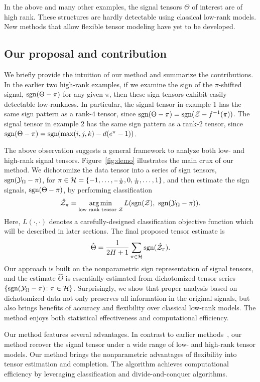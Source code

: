 \documentclass{article}
\theoremstyle{plain}
\theoremstyle{definition}
\def\sign{\textup{sgn}}
\begin{document}
In the above and many other examples, the signal tensors $\Theta$ of interest are of high rank. These structures are hardly detectable using classical low-rank models. New methods that allow flexible tensor modeling have yet to be developed. 


\subsection{Our proposal and contribution}\label{sec:overview}
We briefly provide the intuition of our method and summarize the contributions. In the earlier two high-rank examples, if we examine the sign of the $\pi$-shifted signal, $\sign(\Theta-\pi)$ for any given $\pi$, then these sign tensors exhibit easily detectable low-rankness. In particular, the signal tensor in example 1 has the same sign pattern as a rank-$4$ tensor, since $\sign(\Theta-\pi)=\sign(\tZ-f^{-1}(\pi))$. The signal tensor in example 2 has the same sign pattern as a rank-2 tensor, since $\sign(\Theta-\pi)=\sign(\max(i,j,k)-d(e^{\pi}-1))$.


The above observation suggests a general framework to analyze both low- and high-rank signal tensors. Figure~\ref{fig:demo} illustrates the main crux of our method. We dichotomize the data tensor into a series of sign tensors, $\sign (\tY_\Omega-\pi)$, for $\pi\in \mathcal{H}=\{-1,\ldots, {\scriptstyle -{1\over H}},0,{\scriptstyle {1\over H}},\ldots,1\}$, and then estimate the sign signals, $\sign(\Theta-\pi)$, by performing classification
\[
\hat \tZ_\pi=\argmin_{\text{low rank tensor $\tZ$}} L(\sign(\tZ),\ \sign (\tY_\Omega-\pi)).
\]
Here, $L(\cdot,\cdot)$ denotes a carefully-designed classification objective function which will be described in later sections. The final proposed tensor estimate is 
\[
\hat \Theta = {1\over 2H+1}\sum_{\pi \in \tH} \sign(\hat \tZ_\pi).
\]
Our approach is built on the nonparametric sign representation of signal tensors, and the estimate $\hat \Theta$ is essentially estimated from dichotomized tensor series $\{\sign(\tY_\Omega-\pi)\colon \pi \in \tH\}$. Surprisingly, we show that proper analysis based on dichotomized data not only preserves all information in the original signals, but also brings benefits of accuracy and flexibility over classical low-rank models. The method enjoys both statistical effectiveness and computational efficiency. 

 Our method features several advantages. In contrast to earlier methods~\cite{hong2020generalized,filipovic2015tucker}, our method recover the signal tensor under a wide range of low- and high-rank tensor models. Our method brings the nonparametric advantages of flexibility into tensor estimation and completion. The algorithm achieves computational efficiency by leveraging classification and divide-and-conquer algorithms.
\end{document}
